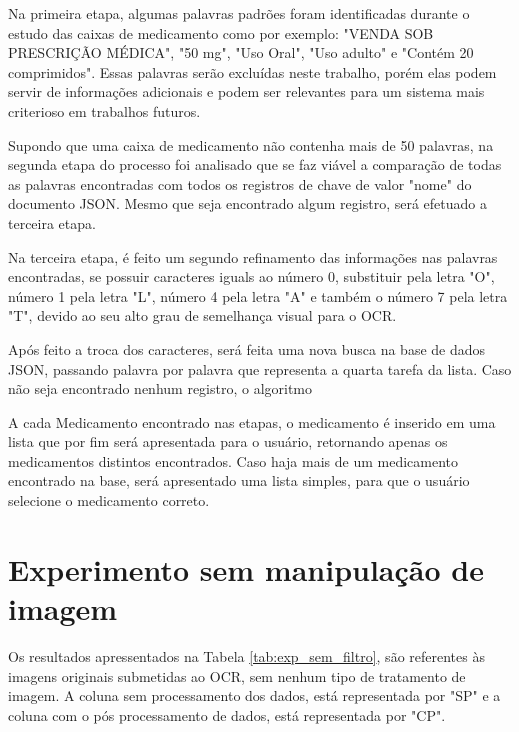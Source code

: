 Na primeira etapa, algumas palavras padrões foram identificadas durante o estudo das caixas de medicamento como por exemplo: "VENDA SOB PRESCRIÇÃO MÉDICA", "50 mg", "Uso Oral", "Uso adulto" e "Contém 20 comprimidos". Essas palavras serão excluídas neste trabalho, porém elas podem servir de informações adicionais e podem ser relevantes para um sistema mais criterioso em trabalhos futuros.

Supondo que uma caixa de medicamento não contenha mais de 50 palavras, na segunda etapa do processo foi analisado que se faz viável a comparação de todas as palavras encontradas com todos os registros de chave de valor "nome" do documento JSON. Mesmo que seja encontrado algum registro, será efetuado a terceira etapa.

Na terceira etapa, é feito um segundo refinamento das informações nas palavras encontradas, se possuir caracteres iguals ao número 0, substituir pela letra "O", número 1 pela letra "L", número 4 pela letra "A" e também o número 7 pela letra "T", devido ao seu alto grau de semelhança visual para o OCR. 

Após feito a troca dos caracteres, será feita uma nova busca na base de dados JSON, passando palavra por palavra que representa a quarta tarefa da lista. Caso não seja encontrado nenhum registro, o algoritmo %

A cada Medicamento encontrado nas etapas, o medicamento é inserido em uma lista que por fim será apresentada para o usuário, retornando apenas os medicamentos distintos encontrados. Caso haja mais de um medicamento encontrado na base, será apresentado uma lista simples, para que o usuário selecione o medicamento correto.


\section{Experimento sem manipulação de imagem}
Os resultados apressentados na Tabela \ref{tab:exp_sem_filtro}, são referentes às imagens originais submetidas ao OCR, sem nenhum tipo de tratamento de imagem. A coluna sem processamento dos dados, está representada por "SP" e a coluna com o pós processamento de dados, está representada por "CP".


